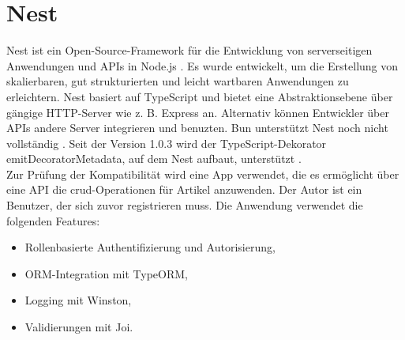 \section{Nest} \label{sec:compabitility-nest}
Nest ist ein Open-Source-Framework für die Entwicklung von serverseitigen Anwendungen und APIs in Node.js \cite{Mysliwiec.2023}. Es wurde entwickelt, um die Erstellung von skalierbaren, gut strukturierten und leicht wartbaren Anwendungen zu erleichtern. Nest basiert auf TypeScript und bietet eine Abstraktionsebene über gängige HTTP-Server wie z. B. Express an. Alternativ können Entwickler über APIs andere Server integrieren und benuzten. Bun unterstützt Nest noch nicht vollständig \cite{Sumner.2022b}. Seit der Version 1.0.3 wird der TypeScript-Dekorator \glq emitDecoratorMetadata\grq{}, auf dem Nest aufbaut, unterstützt \cite{McDonnel.2023}.\\

\noindent
Zur Prüfung der Kompatibilität wird eine App verwendet, die es ermöglicht über eine API die \ac{crud}-Operationen für Artikel anzuwenden. Der Autor ist ein Benutzer, der sich zuvor registrieren muss. Die Anwendung verwendet die folgenden Features:

\begin{itemize}
	\item Rollenbasierte Authentifizierung und Autorisierung,
	\item ORM-Integration mit TypeORM,
	\item Logging mit Winston,
	\item Validierungen mit Joi.
\end{itemize}

